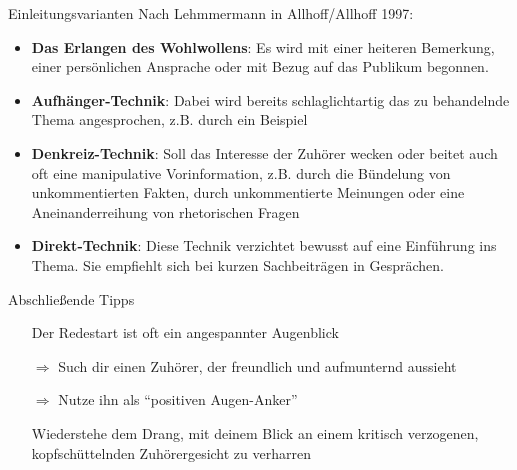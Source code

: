 \begin{frame}{Einleitungsvarianten}
    Nach Lehmmermann in Allhoff/Allhoff 1997:
    \begin{itemize}[<+->]
        \item \textbf{Das Erlangen des Wohlwollens}: Es wird mit einer
              heiteren Bemerkung, einer persönlichen Ansprache oder mit
              Bezug auf das Publikum begonnen.
        \item \textbf{Aufhänger-Technik}: Dabei wird bereits schlaglichtartig
              das zu behandelnde Thema angesprochen, z.B. durch ein
              Beispiel
        \item \textbf{Denkreiz-Technik}: Soll das Interesse der 
              Zuhörer wecken oder beitet auch oft eine manipulative
              Vorinformation, z.B. durch die Bündelung von 
              unkommentierten Fakten, durch unkommentierte Meinungen
              oder eine Aneinanderreihung von rhetorischen Fragen
        \item \textbf{Direkt-Technik}: Diese Technik verzichtet 
              bewusst auf eine Einführung ins Thema. Sie empfiehlt
              sich bei kurzen Sachbeiträgen in Gesprächen.
    \end{itemize}
\end{frame}

\begin{frame}{Abschließende Tipps}
    \begin{itemize}[<+->]
        \item[] Der Redestart ist oft ein angespannter Augenblick
        \item[$\Rightarrow$] Such dir einen Zuhörer, der freundlich und aufmunternd aussieht
        \item[$\Rightarrow$] Nutze ihn als "`positiven Augen-Anker"'
        \item[] Wiederstehe dem Drang, mit deinem Blick an einem 
                kritisch verzogenen, kopfschüttelnden Zuhörergesicht zu verharren
    \end{itemize}
\end{frame}

